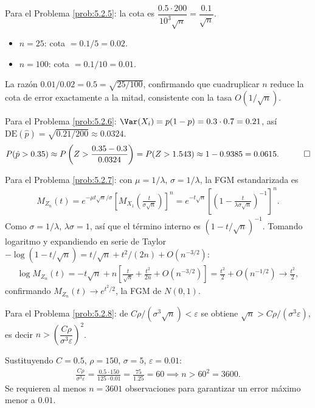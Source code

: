 \begin{solucion}
	\label{sol:5.2.5}
	Para el Problema \ref{prob:5.2.5}: la cota es $\dfrac{0.5\cdot 200}{10^3\sqrt n} = \dfrac{0.1}{\sqrt n}$.
	\begin{itemize}
		\item $n=25$: cota $= 0.1/5 = 0.02$.
		\item $n=100$: cota $= 0.1/10 = 0.01$.
	\end{itemize}
	La razón $0.01/0.02 = 0.5 = \sqrt{25/100}$, confirmando que cuadruplicar $n$ reduce la cota de error exactamente a la mitad, consistente con la tasa $O(1/\sqrt n)$. \quad \qedhere
\end{solucion}

\begin{solucion}
	\label{sol:5.2.6}
	Para el Problema \ref{prob:5.2.6}: $\Var(X_i) = p(1-p) = 0.3\cdot 0.7 = 0.21$, así $\text{DE}(\hat p) = \sqrt{0.21/200} \approx 0.0324$.
	\begin{align*}
		P(\hat p > 0.35) \approx P\left(Z > \frac{0.35-0.3}{0.0324}\right) = P(Z > 1.543) \approx 1-0.9385 = 0.0615. \quad \qedhere
	\end{align*}
\end{solucion}

\begin{solucion}
	\label{sol:5.2.7}
	Para el Problema \ref{prob:5.2.7}: con $\mu=1/\lambda$, $\sigma=1/\lambda$, la FGM estandarizada es
	\begin{align*}
		M_{Z_n}(t) = e^{-\mu t\sqrt n/\sigma}\left[M_{X_1}\!\left(\frac{t}{\sigma\sqrt n}\right)\right]^n
		= e^{-t\sqrt n}\left[\left(1-\frac{t}{\lambda\sigma\sqrt n}\right)^{-1}\right]^n.
	\end{align*}
	Como $\sigma=1/\lambda$, $\lambda\sigma=1$, así que el término interno es $(1-t/\sqrt n)^{-1}$. Tomando logaritmo y expandiendo en serie de Taylor $-\log(1-t/\sqrt n) = t/\sqrt n + t^2/(2n) + O(n^{-3/2})$:
	\begin{align*}
		\log M_{Z_n}(t) = -t\sqrt n + n\left[\frac{t}{\sqrt n}+\frac{t^2}{2n}+O(n^{-3/2})\right] = \frac{t^2}{2}+O(n^{-1/2}) \longrightarrow \frac{t^2}{2},
	\end{align*}
	confirmando $M_{Z_n}(t)\to e^{t^2/2}$, la FGM de $N(0,1)$. \quad \qedhere
\end{solucion}

\begin{solucion}
	\label{sol:5.2.8}
	Para el Problema \ref{prob:5.2.8}: de $C\rho/(\sigma^3\sqrt n) < \varepsilon$ se obtiene $\sqrt n > C\rho/(\sigma^3\varepsilon)$, es decir $n > \left(\dfrac{C\rho}{\sigma^3\varepsilon}\right)^2$.

	Sustituyendo $C=0.5$, $\rho=150$, $\sigma=5$, $\varepsilon=0.01$:
	\begin{align*}
		\frac{C\rho}{\sigma^3\varepsilon} = \frac{0.5\cdot 150}{125\cdot 0.01} = \frac{75}{1.25} = 60 \implies n > 60^2 = 3600.
	\end{align*}
	Se requieren al menos $n=3601$ observaciones para garantizar un error máximo menor a $0.01$. \quad \qedhere
\end{solucion}

